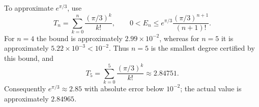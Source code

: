 \begin{remark}
To approximate $e^{\pi/3}$, use
\[
T_n=\sum_{k=0}^{n}\frac{(\pi/3)^k}{k!},\qquad
0<E_n\leq e^{\pi/3}\frac{(\pi/3)^{n+1}}{(n+1)!}.
\]
For $n=4$ the bound is approximately $2.99\times10^{-2}$, whereas
for $n=5$ it is approximately $5.22\times10^{-3}<10^{-2}$.
Thus $n=5$ is the smallest degree certified by this bound, and
\[
T_5=\sum_{k=0}^{5}\frac{(\pi/3)^k}{k!}
\approx2.84751.
\]
Consequently $e^{\pi/3}\approx2.85$ with absolute error below
$10^{-2}$; the actual value is approximately $2.84965$.
\end{remark}
